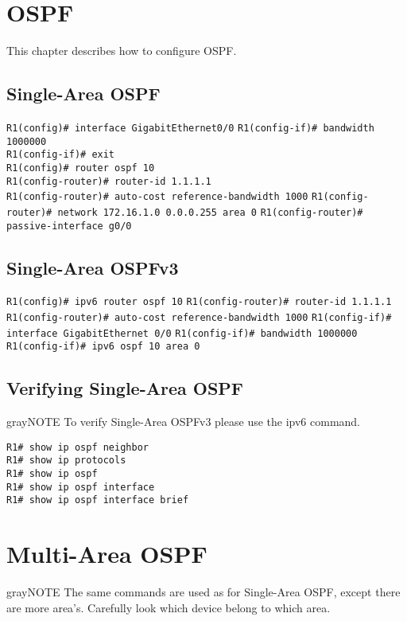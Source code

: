 \section{OSPF}
This chapter describes how to configure OSPF.
\subsection{Single-Area OSPF}
\verb!R1(config)# interface GigabitEthernet0/0!
\verb!R1(config-if)# bandwidth 1000000! \\
\verb!R1(config-if)# exit! \\
\verb!R1(config)# router ospf 10! \\
\verb!R1(config-router)# router-id 1.1.1.1! \\
\verb!R1(config-router)# auto-cost reference-bandwidth 1000!
\verb!R1(config-router)# network 172.16.1.0 0.0.0.255 area 0!
\verb!R1(config-router)# passive-interface g0/0!

\subsection{Single-Area OSPFv3}
\verb!R1(config)# ipv6 router ospf 10!
\verb!R1(config-router)# router-id 1.1.1.1!
\verb!R1(config-router)# auto-cost reference-bandwidth 1000!
\verb!R1(config-if)# interface GigabitEthernet 0/0!
\verb!R1(config-if)# bandwidth 1000000!
\verb!R1(config-if)# ipv6 ospf 10 area 0!

\subsection{Verifying Single-Area OSPF}
\begin{textbox}{gray}{NOTE}
To verify Single-Area OSPFv3 please use the ipv6 command.
\end{textbox}
\verb!R1# show ip ospf neighbor! \\
\verb!R1# show ip protocols! \\
\verb!R1# show ip ospf! \\
\verb!R1# show ip ospf interface! \\
\verb!R1# show ip ospf interface brief! \\

\section{Multi-Area OSPF}
\begin{textbox}{gray}{NOTE}
The same commands are used as for Single-Area OSPF, except there are more area's. Carefully look which device belong to which area.
\end{textbox}
